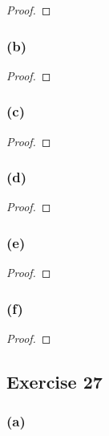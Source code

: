 \documentclass[14pt]{extarticle}
\begin{document}
\begin{proof}

\end{proof}

\subsubsection{(b)}

\begin{proof}

\end{proof}

\subsubsection{(c)}

\begin{proof}

\end{proof}

\subsubsection{(d)}

\begin{proof}

\end{proof}

\subsubsection{(e)}

\begin{proof}

\end{proof}

\subsubsection{(f)}

\begin{proof}

\end{proof}

\subsection{Exercise 27}

\subsubsection{(a)}
\end{document}
